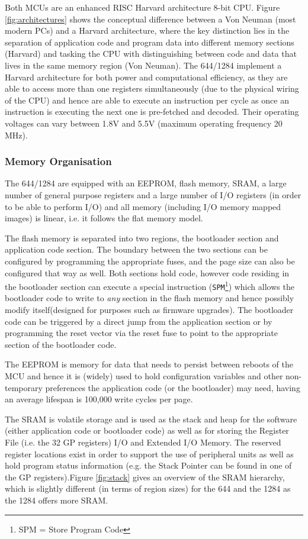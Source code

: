\documentclass[12pt,a4paper,twocolumn]{article}
\begin{document}
	Both MCUs are an enhanced RISC Harvard architecture 8-bit CPU. Figure \ref{fig:architectures} shows the conceptual difference between a Von Neuman (most modern PCs) and a Harvard architecture, where the key distinction lies in the separation of application code and program data into different memory sections (Harvard) and tasking the CPU with distinguishing between code and data that lives in the same memory region (Von Neuman). The 644/1284 implement a Harvard architecture for both power and computational efficiency, as they are able to access more than one registers simultaneously (due to the physical wiring of the CPU) and hence are able to execute an instruction per cycle as once an instruction is executing the next one is pre-fetched and decoded. Their operating voltages can vary between 1.8V and 5.5V (maximum operating frequency 20 MHz).
	
	\subsubsection{Memory Organisation}
	The 644/1284 are equipped with an EEPROM, flash memory, SRAM, a large number of general purpose registers and a large number of I/O registers (in order to be able to perform I/O) and all memory (including I/O memory mapped images) is linear, i.e. it follows the flat memory model.
	
	The flash memory is separated into two regions, the bootloader section and application code section. The boundary between the two sections can be configured by programming the appropriate fuses, and the page size can also be configured that way as well. Both sections hold code, however code residing in the bootloader section can execute a special instruction (\texttt{SPM}\footnote{SPM = Store Program Code}) which allows the bootloader code to write to \textit{any} section in the flash memory and hence possibly modify itself(designed for purposes such as firmware upgrades). The bootloader code can be triggered by a direct jump from the application section or by programming the reset vector via the reset fuse to point to the appropriate section of the bootloader code. 
	
	The EEPROM is memory for data that needs to persist between reboots of the MCU and hence it is (widely) used to hold configuration variables and other non-temporary preferences the application code (or the bootloader) may need, having an average lifespan is 100,000 write cycles per page. 
	
	The SRAM is volatile storage and is used as the stack and heap for the software (either application code or bootloader code) as well as for storing the Register File (i.e. the 32 GP registers) I/O and Extended I/O Memory. The reserved register locations exist in order to support the use of peripheral units as well as hold program status information (e.g. the Stack Pointer can be found in one of the GP registers).Figure \ref{fig:stack} gives an overview of the SRAM hierarchy, which is slightly different (in terms of region sizes) for the 644 and the 1284 as the 1284 offers more SRAM.
	
\end{document}

